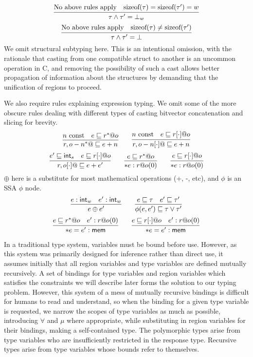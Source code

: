 \[
\infer{\tau \wedge \tau' = \bot_{w}}{\textrm{No above rules apply} & \textrm{sizeof}(\tau) = \textrm{sizeof}(\tau') = w}
\]
\[
\infer{\tau \wedge \tau' = \ubot}{\textrm{No above rules apply} & \textrm{sizeof}(\tau) \neq \textrm{sizeof}(\tau')}
\]
We omit structural subtyping here. This is an intentional omission, with the rationale that casting from one compatible struct to another is an uncommon operation in C, and removing the possibility of such a cast allows better propagation of information about the structures by demanding that the unification of regions to proceed.

We also require rules explaining expression typing. We omit some of the more obscure rules dealing with different types of casting bitvector concatenation and slicing for brevity.
\[
\infer{\lptr{r,o-n} \subt e + n}{n\ \textrm{const} & e \subt \lptr{r}{o}}
\qquad
\infer{\aptr{r,o-n} \subt e + n}{n\ \textrm{const} & e \subt \aptr{r}{o}}
\]
\[
\infer{\aptr{r,o} \subt e + e'}{e' \subt \tint{s} & e \subt \aptr{r}{o}}
\qquad
\infer{*e : r@o(0)}{e \subt \lptr{r}{o}}
\qquad
\infer{*e : r@o(0)}{e \subt \aptr{r}{o}}
\]
$\oplus$ here is a substitute for most mathematical operations (+, -, etc), and $\phi$ is an SSA $\phi$ node.
\[
\infer{e \oplus e'}{e : \tint{w} & e' : \tint{w}} \qquad \infer{\phi(e, e') \subt \tau \vee \tau'}{e \subt \tau & e' \subt \tau'}
\]
\[
\infer{*e = e' : \mem}{e \subt \lptr{r}{o} & e' : r@o(0)}
\qquad
\infer{*e = e' : \mem}{e \subt \aptr{r}{o} & e' : r@o(0)}
\]

In a traditional type system, variables must be bound before use. However, as this system was primarily designed for inference rather than direct use, it assumes initially that all region variables and type variables are defined mutually recursively. A set of bindings for type variables and region variables which satisfies the constraints we will describe later forms the solution to our typing problem. However, this system of a mess of mutually recursive bindings is difficult for humans to read and understand, so when the binding for a given type variable is requested, we narrow the scopes of type variables as much as possible, introducing $\forall$ and $\mu$ where appropriate, while substituting in region variables for their bindings, making a self-contained type. The polymorphic types arise from type variables who are insufficiently restricted in the response type. Recursive types arise from type variables whose bounds refer to themselves.

